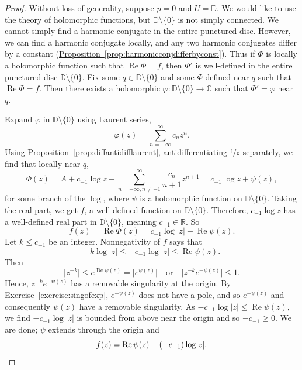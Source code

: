\documentclass[12pt,openany]{book}
\renewcommand{\Re}{\operatorname{Re}}
\newcommand{\sabs}[1]{\lvert {#1} \rvert}
\newcommand{\babs}[1]{\bigl\lvert {#1} \bigr\rvert}
\newcommand{\C}{{\mathbb{C}}}
\newcommand{\R}{{\mathbb{R}}}
\newcommand{\D}{{\mathbb{D}}}
\theoremstyle{plain}
\theoremstyle{remark}
\theoremstyle{definition}
\theoremstyle{exercise}
\theoremstyle{example}
\newcommand{\exerciseref}[1]{\hyperref[#1]{Exercise~\ref*{#1}}}
\newcommand{\propref}[1]{\hyperref[#1]{Proposition~\ref*{#1}}}
\begin{document}
\begin{proof}
Without loss of generality, suppose $p=0$ and $U = \D$.
We would like to use the theory of holomorphic functions,
but $\D \setminus \{ 0 \}$ is not simply connected.  We cannot simply find a
harmonic conjugate in the entire punctured disc.  However, we can find a harmonic
conjugate locally, and any two harmonic conjugates differ by a
constant (\propref{prop:harmonicconjdifferbyconst}).
Thus if $\Phi$ is locally a holomorphic function
such that $\Re \Phi = f$, then $\Phi'$ is well-defined in the entire
punctured disc $\D \setminus \{ 0 \}$.  Fix some $q \in \D \setminus \{ 0 \}$
and some $\Phi$ defined near $q$ such that $\Re \Phi = f$.
Then there exists a holomorphic $\varphi \colon
\D \setminus \{ 0 \} \to \C$ such that $\Phi' = \varphi$ near $q$.

Expand $\varphi$ in $\D \setminus \{ 0 \}$ using Laurent series,
\begin{equation*}
\varphi(z) = \sum_{n=-\infty}^\infty c_n {z}^n .
\end{equation*}
Using \propref{prop:diffantidifflaurent},
antidifferentiating $\nicefrac{1}{z}$ separately,
we find that locally near $q$,
\begin{equation*}
\Phi(z) =
A+
c_{-1} \log z +  
\sum_{n=-\infty,n \neq -1}^\infty \frac{c_n}{n+1} {z}^{n+1}
=
c_{-1} \log z +  
\psi(z),
\end{equation*}
for some branch of the $\log$, where $\psi$ is a holomorphic function
on $\D \setminus \{ 0 \}$.
Taking the real part, we get $f$, a well-defined function on
$\D \setminus \{ 0 \}$.  Therefore,
$c_{-1} \log z$ has a well-defined real part in $\D \setminus \{ 0 \}$,
meaning $c_{-1} \in \R$.
So
\begin{equation*}
f(z) = \Re \Phi(z) =
c_{-1} \log \sabs{z} +  
\Re \psi(z).
\end{equation*}
Let $k \leq c_{-1}$ be an integer.
Nonnegativity of $f$ says that
\begin{equation*}
-k \log \sabs{z} \leq
-c_{-1} \log \sabs{z} \leq  \Re \psi(z) .
\end{equation*}
Then
\begin{equation*}
\sabs{z^{-k}} \leq e^{\Re \psi(z)} = \babs{e^{\psi(z)}} 
\quad
\text{or}
\quad
\sabs{z^{-k} e^{-\psi(z)}} \leq 1 .
\end{equation*}
Hence, 
$z^{-k} e^{-\psi(z)}$ has
a removable singularity at the origin.
By \exerciseref{exercise:singofexp}, 
$e^{-\psi(z)}$ does not have a pole,
and so $e^{-\psi(z)}$ and consequently
$\psi(z)$ have a removable singularity.
As $-c_{-1} \log\sabs{z} \leq \Re \psi(z)$,
we find $-c_{-1} \log\sabs{z}$ is bounded from above
near the origin and so $-c_{-1} \geq 0$.
We are done; $\psi$ extends through the origin
and
\begin{equation*}
f(z) = \Re \psi(z) - (-c_{-1}) \log \sabs{z} . \qedhere
\end{equation*}
\end{proof}
\end{document}

